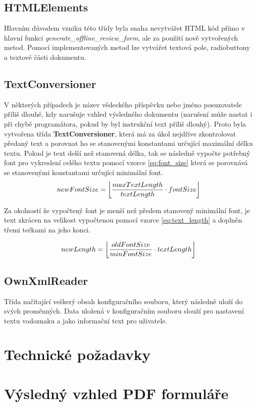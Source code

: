 \subsection{HTMLElements}
Hlavním důvodem vzniku této třídy byla snaha nevytvářet HTML kód přímo v hlavní funkci \textit{generate\_offline\_review\_form}, ale za použití nově vytvořených metod. Pomocí implementovaných metod lze vytvářet textová pole, radiobuttony a textové části dokumentu.
\subsection{TextConversioner}
V některých případech je název vědeckého příspěvku nebo jméno posuzovatele příliš dlouhé, kdy narušuje vzhled výsledného dokumentu (narušení může nastat i při chybě programátora, pokud by byl instrukční text příliš dlouhý). Proto byla vytvořena třída \textbf{TextConversioner}, která má za úkol nejdříve zkontrolovat předaný text a porovnat ho se stanovenými konstantami určující maximální délku textu. Pokud je text delší než stanovená délka, tak se následně vypočte potřebný font pro vykreslení celého textu pomocí vzorce \eqref{eq:font_size} která se porovnává se stanovenými konstantami určující minimální font. 
\begin{equation}
newFontSize = \floor*{\frac{maxTextLength}{textLength} \cdot fontSize} \label{eq:font_size}
\end{equation}

Za okolností že vypočtený font je menší než předem stanovený minimální font, je text zkrácen na velikost vypočtenou pomocí vzorce  \eqref{eq:text_length} a doplněn třemi tečkami na jeho konci. 

\begin{equation}
newLength = \floor*{\frac{oldFontSize}{minFontSize} \cdot textLength} \label{eq:text_length}
\end{equation}
\subsection{OwnXmlReader}
Třída načítající veškerý obsah konfiguračního souboru, který následně uloží do svých proměnných. Data uložená v konfiguračním souboru slouží pro nastavení textu vodoznaku a jako informační text pro uživatele.
\section{Technické požadavky}
\section{Výsledný vzhled PDF formuláře}


